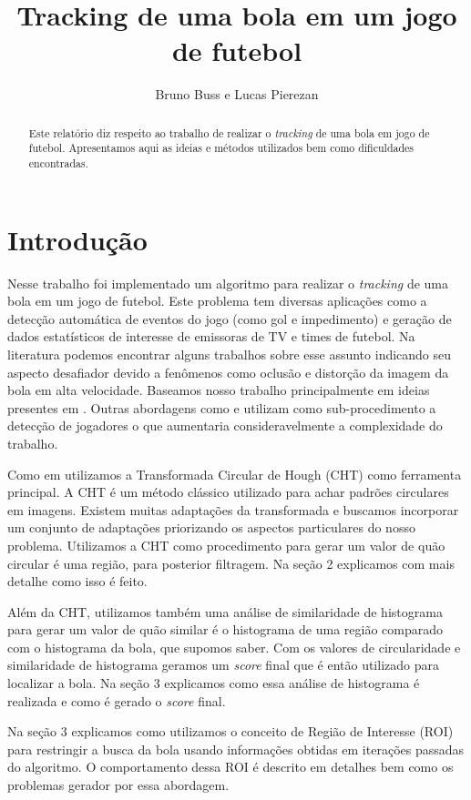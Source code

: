\documentclass[11pt,a4paper]{article}
\title{Tracking de uma bola em um jogo de futebol}
\author{Bruno Buss e Lucas Pierezan}
\begin{document}
\maketitle

\begin{abstract}
 Este relatório diz respeito ao trabalho de realizar o \textit{tracking} de uma bola em jogo de futebol. Apresentamos aqui as ideias e métodos utilizados bem como dificuldades encontradas.
\end{abstract}

\section{Introdução}
 Nesse trabalho foi implementado um algoritmo para realizar o \textit{tracking} de uma bola em um jogo de futebol. Este problema tem diversas aplicações como a detecção automática de eventos do jogo (como gol e impedimento) e geração de dados estatísticos de interesse de emissoras de TV e times de futebol. Na literatura podemos encontrar alguns trabalhos sobre esse assunto \cite{D'Orazio}\cite{Choi}\cite{Tong} indicando seu aspecto desafiador devido a fenômenos como oclusão e distorção da imagem da bola em alta velocidade. Baseamos nosso trabalho principalmente em ideias presentes em \cite{D'Orazio}. Outras abordagens como \cite{Choi} e \cite{Tong} utilizam como sub-procedimento a detecção de jogadores o que aumentaria consideravelmente a complexidade do trabalho.

Como em \cite{D'Orazio} utilizamos a Transformada Circular de Hough (CHT) como ferramenta principal. A CHT é um método clássico utilizado para achar padrões circulares em imagens. Existem muitas adaptações da transformada\cite{Yuen} e buscamos incorporar um conjunto de adaptações priorizando os aspectos particulares do nosso problema. Utilizamos a CHT como procedimento para gerar um valor de quão circular é uma região, para posterior filtragem. Na seção 2 explicamos com mais detalhe como isso é feito.

Além da CHT, utilizamos também uma análise de similaridade de histograma para gerar um valor de quão similar é o histograma de uma região comparado com o histograma da bola, que supomos saber. Com os valores de circularidade e similaridade de histograma geramos um \textit{score} final que é então utilizado para localizar a bola. Na seção 3 explicamos como essa análise de histograma é realizada e como é gerado o \textit{score} final.

Na seção 3 explicamos como utilizamos o conceito de Região de Interesse (ROI) para restringir a busca da bola usando informações obtidas em iterações passadas do algoritmo. O comportamento dessa ROI é descrito em detalhes bem como os problemas gerador por essa abordagem.
\end{document}
